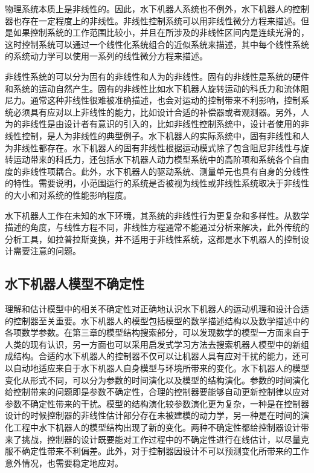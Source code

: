 物理系统本质上是非线性的。因此，水下机器人系统也不例外，水下机器人的控制器也存在一定程度上的非线性。非线性控制系统可以用非线性微分方程来描述。但是如果控制系统的工作范围比较小，并且在所涉及的非线性区间内是连续光滑的，这时控制系统可以通过一个线性化系统组合的近似系统来描述，其中每个线性系统的系统动力学可以使用一系列的线性微分方程来描述。

非线性系统的可以分为固有的非线性和人为的非线性。固有的非线性是系统的硬件和系统的运动自然产生。固有的非线性比如水下机器人旋转运动的科氏力和流体阻尼力。通常这种非线性很难被准确描述，也会对运动的控制带来不利影响，控制系统必须具有应对以上非线性的能力，比如设计合适的补偿器或者观测器。另外，人为的非线性是由设计者有意识的引入的，比如非线性控制系统中，设计者使用的非线性控制，是人为非线性的典型例子。水下机器人的实际系统中，固有非线性和人为非线性都存在。水下机器人的固有非线性根据运动模式除了包含阻尼非线性与旋转运动带来的科氏力，还包括水下机器人动力模型系统中的高阶项和系统各个自由度的非线性项耦合。此外，水下机器人的驱动系统、测量单元也具有自身的分线性的特性。需要说明，小范围运行的系统是否被视为线性或非线性系统取决于非线性的大小和对系统的性能影响程度。

水下机器人工作在未知的水下环境，其系统的非线性行为更复杂和多样性。从数学描述的角度，与线性方程不同，非线性方程通常不能通过分析来解决，此外传统的分析工具，如拉普拉斯变换，并不适用于非线性系统，这都是水下机器人的控制设计需要注意的问题。


\subsection{水下机器人模型不确定性 }

理解和估计模型中的相关不确定性对正确地认识水下机器人的运动机理和设计合适的控制器至关重要。水下机器人的模型包括模型的数学描述结构以及数学描述中的各项数学参数。在第三章的模型结构搜索部分，可以发现数学的模型一方面来自于人类的现有认识，另一方面也可以采用启发式学习方法去搜索机器人模型中的新组成结构。合适的水下机器人的控制器不仅可以让机器人具有应对干扰的能力，还可以自动地适应来自于水下机器人自身模型与环境所带来的变化。水下机器人的模型变化从形式不同，可以分为参数的时间演化以及模型的结构演化。参数的时间演化给控制带来的问题即是参数不确定性，合理的控制器要能够自动更新控制律以应对参数不确定性带来的干扰。模型的结构演化较参数演化更为复杂，一种是在控制器设计的时候控制器的非线性估计部分存在未被建模的动力学，另一种是在时间的演化工程中水下机器人的模型结构出现了新的变化。两种不确定性都给控制器设计带来了挑战，控制器的设计既要能对工作过程中的不确定性进行在线估计，以尽量克服不确定性带来不利偏差。此外，对于控制器因设计不可以预测变化所带来的工作意外情况，也需要稳定地应对。

